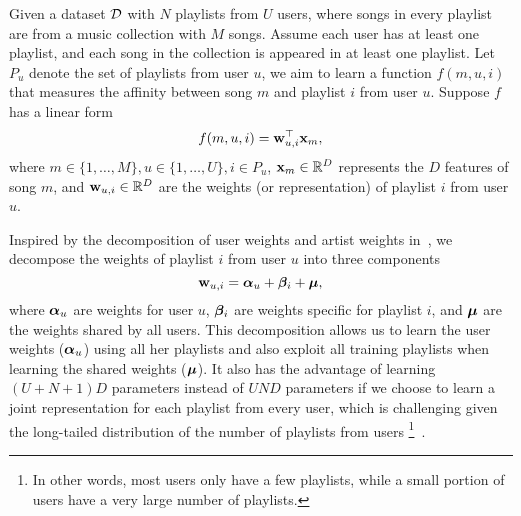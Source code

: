Given a dataset $\mathcal{D}$ with $N$ playlists from $U$ users, 
where songs in every playlist are from a music collection with $M$ songs.
Assume each user has at least one playlist, and each song in the collection 
is appeared in at least one playlist.
%
Let $P_u$ denote the set of playlists from user $u$,
we aim to learn a function $f(m, u, i)$ that measures the affinity between song $m$ and playlist $i$ from user $u$.
Suppose $f$ has a linear form
\begin{equation}
\label{eq:scorefunc}
f(m, u, i) = \mathbf{w}_{u,i}^\top \mathbf{x}_m,
\end{equation}
where $m \in \{1,\dots,M\}, u \in \{1,\dots,U\}, i \in P_u$,
$\mathbf{x}_m \in \mathbb{R}^D$ represents the $D$ features of song $m$,
and $\mathbf{w}_{u,i} \in \mathbb{R}^D$ are the weights (or representation) of playlist $i$ from user $u$.



Inspired by the decomposition of user weights and artist weights in~\cite{ben2017groove},
we decompose the weights of playlist $i$ from user $u$ %
into three components
\begin{equation}
\label{eq:decomp}
\mathbf{w}_{u, i} = {\bm{\alpha}}_u + {\bm{\beta}}_i + \bm{\mu},
\end{equation}
where ${\bm{\alpha}}_u$ are weights for user $u$,
${\bm{\beta}}_i$ are weights specific for playlist $i$, %
and $\bm{\mu}$ are the weights shared by all users.
This decomposition allows us to learn the user weights (\ie ${\bm{\alpha}}_u$) using all her
playlists and also exploit all training playlists when learning the shared weights (\ie $\bm{\mu}$).
It also has the advantage of learning $(U + N + 1) D$ parameters instead of $U N D$ parameters 
if we choose to learn a joint representation for each playlist from every user,
which is challenging given the long-tailed distribution
of the number of playlists from users
\footnote{In other words, most users only have a few playlists, 
while a small portion of users have a very large number of playlists.}~\cite{bonnin2013evaluating}.

